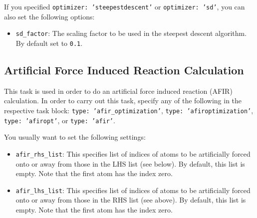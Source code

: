 \documentclass[]{tufte-book}
\begin{document}
If you specified \texttt{optimizer: 'steepestdescent'} or \texttt{optimizer: 'sd'}, you can also set the following options:
\begin{itemize}
\item \texttt{sd\_factor}: The scaling factor to be used in the steepest descent algorithm. By default set to \texttt{0.1}.
\end{itemize}

\subsection{Artificial Force Induced Reaction Calculation}

This task is used in order to do an artificial force induced reaction (AFIR\cite{afir1, afir2}) calculation. In 
order to carry out this task, specify any of the following in the respective task block: \texttt{type: 'afir\_optimization'}, 
\texttt{type: 'afiroptimization'}, \texttt{type: 'afiropt'}, or \texttt{type: 'afir'}.

You usually want to set the following settings:
\begin{itemize}
\item \texttt{afir\_rhs\_list}: This specifies list of indices of atoms to be artificially forced onto or away from those 
in the LHS list (see below). By default, this list is empty. Note that the first atom has the index zero.
\item \texttt{afir\_lhs\_list}: This specifies list of indices of atoms to be artificially forced onto or away from those 
in the RHS list (see above). By default, this list is empty. Note that the first atom has the index zero.
\end{itemize}
\end{document}
